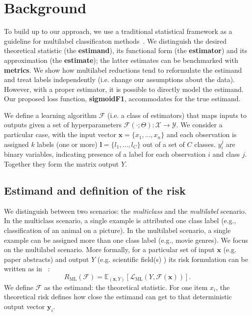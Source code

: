
\section{Background}
\label{section:background}

To build up to our approach, we use a traditional statistical framework as a guideline for multilabel classificaton methods~\citep{tukey}. We distinguish the desired theoretical statistic (the \textbf{estimand}), its functional form (the \textbf{estimator}) and its approximation (the \textbf{estimate}); the latter estimates can be benchmarked with \textbf{metrics}. We show how multilabel reductions tend to reformulate the estimand and treat labels independently (i.e. change our assumptions about the data). However, with a proper estimator, it is possible to directly model the estimand. Our proposed loss function, \textbf{sigmoidF1}, accommodates for the true estimand.

We define a learning algorithm $\mathcal{F}$ (i.e. a class of estimators) that maps inputs to outputs given a set of hyperparameters \(\mathcal{F}(\cdot ; \Theta): \mathcal{X} \rightarrow \mathcal{Y}\). We consider a particular case, with the input vector \(\mathbf{x} = \{x_1, \ldots, x_n\}\) and each observation is assigned $k$ labels (one or more) \(\mathbf{l} = \{l_1, \ldots, l_C\}\) out of a set of $C$ classes. \(y_{i}^{j}\) are binary variables, indicating presence of a label for each observation \(i\) and class \(j\). Together they form the matrix output $Y$.

\subsection{Estimand and definition of the risk}
\label{section:background:estimand}

We distinguish between two scenarios: the \emph{multiclass} and the \emph{multilabel} scenario. 
In the multiclass scenario, a single example is attributed one class label (e.g., classification of an animal on a picture). 
In the multilabel scenario, a single example can be assigned more than one class label (e.g., movie genres). 
We focus on the multilabel scenario. More formally, for a particular set of input $\mathbf{x}$ (e.g. paper abstracts) and output $Y$ (e.g. scientific field(s) ) its risk formulation can be written as in ~\citep{multilabelReduction}:
%
\begin{equation}
R_{\mathrm{ML}}(\mathcal{F}) = \mathbb{E}_{(\mathbf{x}, Y)}\left[\mathcal{L}_{\mathrm{ML}}(Y, \mathcal{F}(\mathbf{x}))\right].
\end{equation}
%
We define $\mathcal{F}$ as the estimand: the theoretical statistic. For one item $x_i$, the theoretical risk defines how close the estimand can get to that deterministic output vector $\mathbf{y}_{i}$.

